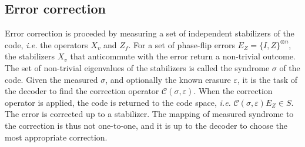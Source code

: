 \subsection{Error correction}
Error correction is proceded by measuring a set of independent stabilizers of the code, \emph{i.e.} the operators $X_v$ and $Z_f$. For a set of phase-flip errors $E_Z = \{I,Z\}^{\otimes n}$, the stabilizers $X_v$ that anticommute with the error return a non-trivial outcome. The set of non-trivial eigenvalues of the stabilizers is called the syndrome $\sigma$ of the code. Given the measured $\sigma$, and optionally the known erasure $\varepsilon$, it is the task of the decoder to find the correction operator $\mathcal{C}(\sigma, \varepsilon)$. When the correction operator is applied, the code is returned to the code space, \emph{i.e.} $\mathcal{C}(\sigma, \varepsilon)E_Z \in S$. The error is corrected up to a stabilizer. The mapping of measured syndrome to the correction is thus not one-to-one, and it is up to the decoder to choose the most appropriate correction. 